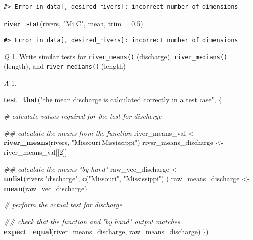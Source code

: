 \documentclass[
]{book}
\newenvironment{Shaded}{\begin{snugshade}}{\end{snugshade}}
\newcommand{\CommentTok}[1]{\textcolor[rgb]{0.56,0.35,0.01}{\textit{#1}}}
\newcommand{\DataTypeTok}[1]{\textcolor[rgb]{0.13,0.29,0.53}{#1}}
\newcommand{\DecValTok}[1]{\textcolor[rgb]{0.00,0.00,0.81}{#1}}
\newcommand{\FloatTok}[1]{\textcolor[rgb]{0.00,0.00,0.81}{#1}}
\newcommand{\KeywordTok}[1]{\textcolor[rgb]{0.13,0.29,0.53}{\textbf{#1}}}
\newcommand{\NormalTok}[1]{#1}
\newcommand{\StringTok}[1]{\textcolor[rgb]{0.31,0.60,0.02}{#1}}
\begin{document}
\begin{verbatim}
#> Error in data[, desired_rivers]: incorrect number of dimensions
\end{verbatim}

\begin{Shaded}
\begin{Highlighting}[]
\KeywordTok{river_stat}\NormalTok{(rivers, }\StringTok{"Mi|C"}\NormalTok{, mean, }\DataTypeTok{trim =} \FloatTok{0.5}\NormalTok{)}
\end{Highlighting}
\end{Shaded}

\begin{verbatim}
#> Error in data[, desired_rivers]: incorrect number of dimensions
\end{verbatim}

\emph{Q} 1. Write similar tests for \texttt{river\_means()} (discharge), \texttt{river\_medians()} (length), and \texttt{river\_medians()} (length)

\emph{A} 1.

\begin{Shaded}
\begin{Highlighting}[]
\KeywordTok{test_that}\NormalTok{(}\StringTok{"the mean discharge is calculated correctly in a test case"}\NormalTok{, \{}
  
  \CommentTok{# calculate values required for the test for discharge}

  \CommentTok{## calculate the means from the function}
\NormalTok{  river_means_val <-}\StringTok{ }\KeywordTok{river_means}\NormalTok{(rivers, }\StringTok{"Missouri|Mississippi"}\NormalTok{)}
\NormalTok{  river_means_discharge <-}\StringTok{ }\NormalTok{river_means_val[[}\DecValTok{2}\NormalTok{]]}

  \CommentTok{## calculate the means "by hand"}
\NormalTok{  raw_vec_discharge <-}\StringTok{ }\KeywordTok{unlist}\NormalTok{(rivers[}\StringTok{"discharge"}\NormalTok{, }\KeywordTok{c}\NormalTok{(}\StringTok{"Missouri"}\NormalTok{, }\StringTok{"Mississippi"}\NormalTok{)])}
\NormalTok{  raw_means_discharge <-}\StringTok{ }\KeywordTok{mean}\NormalTok{(raw_vec_discharge)}
  
  \CommentTok{# perform the actual test for discharge}

  \CommentTok{## check that the function and "by hand" output matches}
  \KeywordTok{expect_equal}\NormalTok{(river_means_discharge, raw_means_discharge)}
\NormalTok{\})}
\end{Highlighting}
\end{Shaded}
\end{document}
